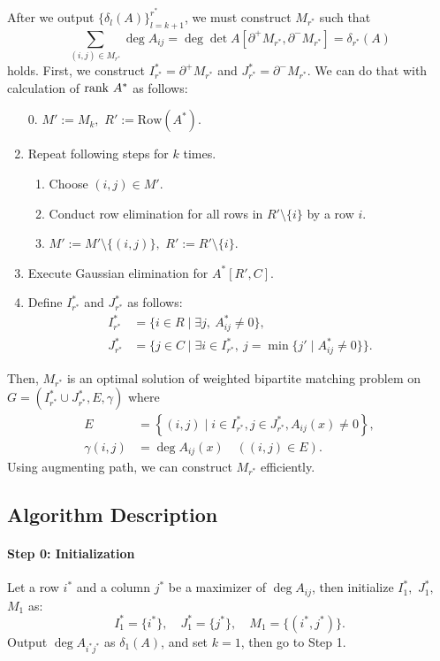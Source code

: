 After we output $ \{ \delta_l (A) \}_{l = k +1}^{r^{\ast}} $, 
we must construct $ M_{r^{\ast}} $ such that
\[ \sum_{ (i,j) \in M_{r^{\ast}} } \deg A_{ij} = \deg \det A[ \partial^+ M_{r^{\ast}} , \partial^- M_{r^{\ast}}] = \delta_{r^{\ast}} (A) \]
holds.
First, we construct $I_{r^{\ast}}^{\ast} = \partial^+ M_{r^{\ast}} $ 
and $ J^{\ast}_{r^{\ast}} = \partial^- M_{r^{\ast}}$. 
We can do that with calculation of $ \mathrm{rank} \  A^{\ast} $ as follows:
\begin{enumerate}
\item[0.] $M':= M_k,$ $R' := \mathrm{Row} (A^{\ast})$.
\item Repeat following steps for $k$ times. 
\begin{enumerate}
\item Choose $ (i,j) \in M' $.
\item Conduct row elimination for all rows in $ R' \setminus \{ i \} $ by a row $ i $.
\item $M':= M' \setminus \{ (i,j)\},$ $ R' := R' \setminus \{i\} $.
\end{enumerate}
\item Execute Gaussian elimination for $ A^{\ast} [R',C] $.
\item Define $ I^{\ast}_{r^{\ast}} $ and $ J^{\ast}_{r^{\ast}} $ as follows:
\begin{align*}
I^{\ast}_{r^{\ast}} &= \{ i \in R \mid \exists j , \ A^{\ast}_{ij} \neq 0 \},\\
J^{\ast}_{r^{\ast}} &= \{ j \in C \mid \exists i \in I^{\ast}_{r^{\ast}}, \ j = \min \{ j' \mid A^{\ast}_{ij} \neq 0 \} \}.
\end{align*}
\end{enumerate}

Then, $M_{r^{\ast}} $ is an optimal solution of weighted bipartite matching problem 
on $ G = ( I^{\ast}_{r^{\ast}} \cup J^{\ast}_{r^{\ast}},E,\gamma )$ where
\begin{align*}
E &= \left\{ (i,j) \mid i \in I^{\ast}_{r^{\ast}}, j \in J^{\ast}_{r^{\ast}} , A_{ij} (x) \neq 0 \right\},\\
\gamma(i,j) &= \deg A_{ij} (x) \quad ((i,j) \in E).
\end{align*}
Using augmenting path, we can construct $M_{r^{\ast}}$ efficiently.

\subsection{Algorithm Description}
\label{description}
\paragraph{Step 0: Initialization\\}
Let a row $i^{\ast}$ and a column $j^{\ast}$ be a maximizer of $ \deg A_{ij} $, then initialize $I^{\ast}_1,$ $J^{\ast}_1,$ $M_1$ as:
\[ I^{\ast}_1 = \{ i^{\ast} \} , \quad J^{\ast}_1 = \{ j^{\ast} \} , \quad M_1 = \{ ( i^{\ast} , j^{\ast} ) \}. \]
Output $ \deg A_{i^{\ast}j^{\ast}} $ as $ \delta_1 (A) $, and set $k=1$, then go to Step 1.

